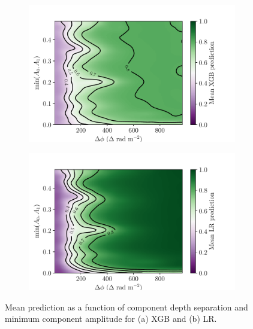     \begin{figure}
      \begin{subfigure}{\linewidth}
        \includegraphics[width=\linewidth]{faraday-images/mean_xgb_prediction_dphi_amp.pdf}
        \caption{\label{fig:faraday-mean-xgb-pred}}
      \end{subfigure}
      \begin{subfigure}{\linewidth}
        \includegraphics[width=\linewidth]{faraday-images/mean_lr_prediction_dphi_amp.pdf}
        \caption{\label{fig:faraday-mean-lr-pred}}
      \end{subfigure}
      \caption[Mean prediction as a function of component depth separation and minimum component amplitude for XGB and LR.]{\label{fig:faraday-amps-dphi-mean} Mean prediction as a function of component depth separation and minimum component amplitude for (a) XGB and (b) LR.}
    \end{figure}

